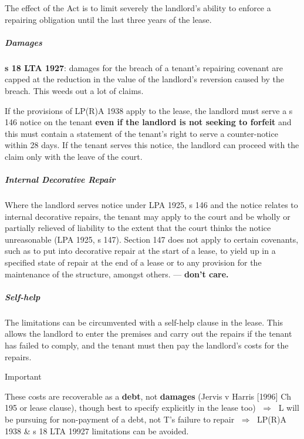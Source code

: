 \documentclass[
]{article}
\newenvironment{env-4361be9f-9a08-465c-86d1-6b024e2d00e2}
{
    \savenotes\tcolorbox[blanker,breakable,left=5pt,borderline west={2pt}{-4pt}{cyan}]
}
{
    \endtcolorbox\spewnotes
}
\begin{document}
The effect of the Act is to limit severely the landlord's ability to
enforce a repairing obligation until the last three years of the lease.

\hypertarget{damages}{%
\subparagraph{Damages}\label{damages}}

\textbf{s 18 LTA 1927}: damages for the breach of a tenant's repairing
covenant are capped at the reduction in the value of the landlord's
reversion caused by the breach. This weeds out a lot of claims.

If the provisions of LP(R)A 1938 apply to the lease, the landlord must
serve a s 146 notice on the tenant \textbf{even if the landlord is not
seeking to forfeit} and this must contain a statement of the tenant's
right to serve a counter-notice within 28 days. If the tenant serves
this notice, the landlord can proceed with the claim only with the leave
of the court.

\hypertarget{internal-decorative-repair}{%
\subparagraph{Internal Decorative
Repair}\label{internal-decorative-repair}}

Where the landlord serves notice under LPA 1925, s 146 and the notice
relates to internal decorative repairs, the tenant may apply to the
court and be wholly or partially relieved of liability to the extent
that the court thinks the notice unreasonable (LPA 1925, s 147). Section
147 does not apply to certain covenants, such as to put into decorative
repair at the start of a lease, to yield up in a specified state of
repair at the end of a lease or to any provision for the maintenance of
the structure, amongst others. --- \textbf{don't care.}

\hypertarget{self-help}{%
\subparagraph{Self-help}\label{self-help}}

The limitations can be circumvented with a self-help clause in the
lease. This allows the landlord to enter the premises and carry out the
repairs if the tenant has failed to comply, and the tenant must then pay
the landlord's costs for the repairs.

\begin{env-4361be9f-9a08-465c-86d1-6b024e2d00e2}

Important

These costs are recoverable as a \textbf{debt}, not \textbf{damages}
(Jervis v Harris {[}1996{]} Ch 195 or lease clause), though best to
specify explicitly in the lease too) {\(\;\Longrightarrow\;\)} L will be
pursuing for non-payment of a debt, not T's failure to repair
{\(\;\Longrightarrow\;\)} LP(R)A 1938 \& s 18 LTA 19927 limitations can
be avoided.

\end{env-4361be9f-9a08-465c-86d1-6b024e2d00e2}
\end{document}
